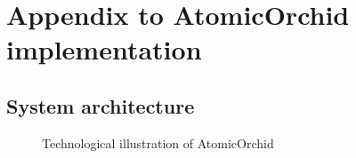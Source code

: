 \chapter{Appendix to AtomicOrchid implementation}


\section{System architecture}

\begin{figure}[H]
  \centering
  \caption{Technological illustration of AtomicOrchid}
  \label{fig:systemDescription}
\end{figure}

